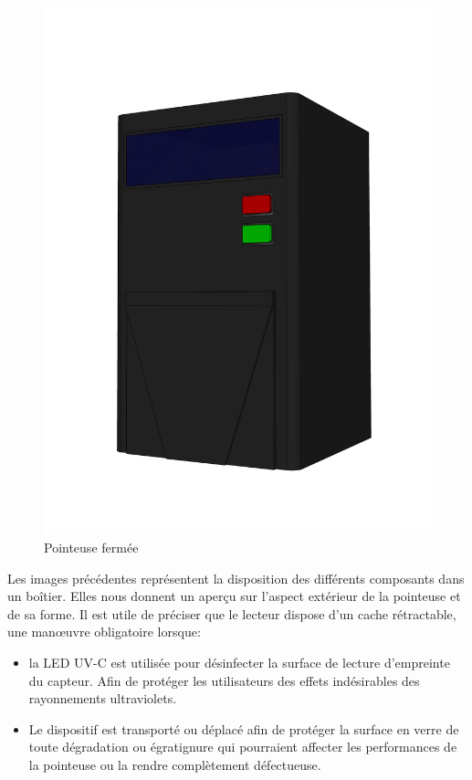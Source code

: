 \begin{figure}[!htb]
\begin{minipage}{0.5\textwidth}
        \includegraphics[scale=0.16]{images/prototype/4.png}
        \vspace{-40pt}
        \caption{Pointeuse fermée}\label{ }
    \end{minipage}
\end{figure}

Les images précédentes représentent la disposition des différents composants 
dans un boîtier. Elles nous donnent un aperçu sur l’aspect extérieur de la 
pointeuse et de sa forme. Il est utile de préciser que le lecteur dispose d’un 
cache rétractable, une manœuvre obligatoire lorsque:

\begin{itemize}
    \item [\textbullet] la LED UV-C est utilisée pour désinfecter la surface de
        lecture d’empreinte du capteur. Afin de protéger les utilisateurs des
        effets indésirables des rayonnements ultraviolets.
    \item [\textbullet]  Le dispositif est transporté ou déplacé afin de
        protéger la surface en verre de toute dégradation ou égratignure qui
        pourraient affecter les performances de la pointeuse ou la rendre
        complètement défectueuse.  
\end{itemize}

